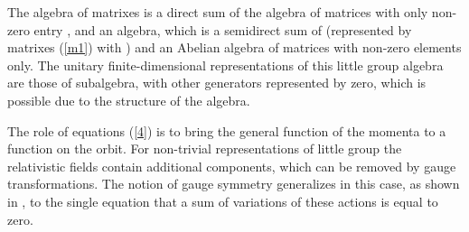 \documentclass[a4paper,12pt]{article}
\begin{document}
The algebra of matrixes \myHighlight{$(\ref{m1})$}\coordHE{} is a direct sum of the
\coordHE{} algebra of matrices \myHighlight{$(\ref{m1})$}\coordHE{} with only non-zero
entry \coordHE{}, and an algebra, which is a semidirect sum of \coordHE{}
(represented by matrixes (\ref {m1}) with \coordHE{}) and an
Abelian algebra of matrices \myHighlight{$(\ref{m1})$}\coordHE{} with non-zero elements
\coordHE{} only. The unitary finite-dimensional representations
of this little group algebra are those of \coordHE{} subalgebra,
with other generators represented by zero, which is possible due
to the structure of the algebra.

The role of equations (\ref{4}) is to bring the general function
of the momenta \coordHE{} to a function on the orbit. For
non-trivial representations of little group the relativistic
fields contain additional components, which can be removed by
gauge transformations. The notion of gauge symmetry generalizes in
this case, as shown in \cite{Man1}, to the single equation that a
sum of variations of these actions is equal to zero.
\end{document}
